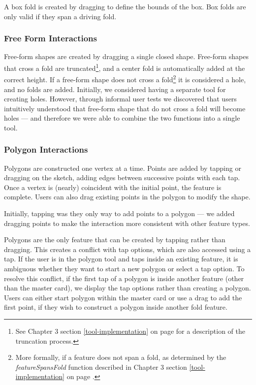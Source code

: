 A box fold is created by dragging to define the bounds of the box. Box
folds are only valid if they span a driving fold.

\subsubsection{Free Form Interactions}\label{free-form-interactions}

Free-form shapes are created by dragging a single closed shape.
Free-form shapes that cross a fold are truncated\footnote{See Chapter 3
  section \ref{tool-implementation} on page \pageref{truncation} for a
  description of the truncation process.}, and a center fold is
automatically added at the correct height. If a free-form shape does not
cross a fold\footnote{More formally, if a feature does not span a fold,
  as determined by the \emph{featureSpansFold} function described in
  Chapter 3 section \ref{tool-implementation} on page
  \pageref{tool-implementation}.} it is considered a hole, and no folds
are added. Initially, we considered having a separate tool for creating
holes. However, through informal user tests we discovered that users
intuitively understood that free-form shape that do not cross a fold
will become holes --- and therefore we were able to combine the two
functions into a single tool.

\subsubsection{Polygon Interactions}\label{polygon-interactions}

Polygons are constructed one vertex at a time. Points are added by
tapping or dragging on the sketch, adding edges between successive
points with each tap. Once a vertex is (nearly) coincident with the
initial point, the feature is complete. Users can also drag existing
points in the polygon to modify the shape.

Initially, tapping was they only way to add points to a polygon --- we
added dragging points to make the interaction more consistent with other
feature types.

Polygons are the only feature that can be created by tapping rather than
dragging. This creates a conflict with tap options, which are also
accessed using a tap. If the user is in the polygon tool and taps inside
an existing feature, it is ambiguous whether they want to start a new
polygon or select a tap option. To resolve this conflict, if the first
tap of a polygon is inside another feature (other than the master card),
we display the tap options rather than creating a polygon. Users can
either start polygon within the master card or use a drag to add the
first point, if they wish to construct a polygon inside another fold
feature.


